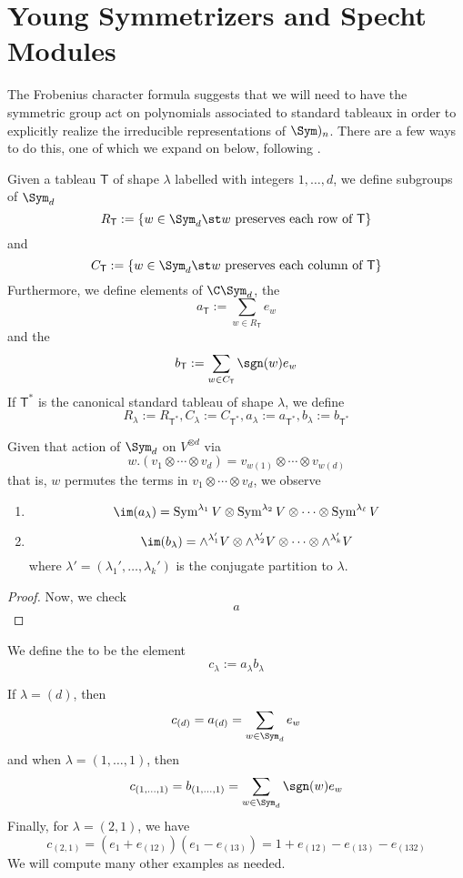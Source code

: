 \documentclass[11pt,leqno,oneside]{amsart}
\numberwithin{thm}{section}
\newcommand{\T}{\mathsf{T}}
\newcommand{\SymP}{\operatorname{Sym}}
\newcommand{\ExtP}{\wedge}
\begin{document}
\section{Young Symmetrizers and Specht Modules}
The Frobenius character formula suggests that we will need to have the
symmetric group act on polynomials associated to standard
tableaux in order to explicitly realize the irreducible
representations of \(\Sym)_n\). There are a few ways to do this, one
of which we expand on below, following \cite{fulton-harris}.
\begin{defn}
  Given a tableau \(\T\) of shape \(\lambda\) labelled with integers
  \(1, \ldots, d\), we define subgroups of \(\Sym_d\) \[
    R_\T := \{w \in \Sym_d \st w \text{ preserves each row of
    }\T\}
  \]
  and \[
    C_\T := \{w \in \Sym_d \st w \text{ preserves each column of
    }\T\}
  \]
  Furthermore, we define elements of \(\C\Sym_d\), the  \[
    a_\T := \sum_{w \in R_\T} e_w
  \]
  and the  \[
    b_\T := \sum_{w \in C_\T} \sgn(w) e_w
  \]
  If \(\T^*\) is the canonical standard tableau of shape \(\lambda\), we
  define \[
    R_\lambda := R_{\T^*}, C_\lambda := C_{\T^*}, a_\lambda :=
    a_{\T^*}, b_{\lambda} := b_{\T^*}
  \]
\end{defn}
\begin{prop}
  Given that action of \(\Sym_d\) on \(V^{\otimes d}\) via \[
    w.(v_1 \otimes \cdots \otimes v_d) = v_{w(1)} \otimes \cdots
    \otimes v_{w(d)}
  \]
  that is, \(w\) permutes the terms in \(v_1 \otimes \cdots \otimes
  v_d\), we observe
  \begin{enumerate}
  \item \[
      \im(a_\lambda) = \SymP^{\lambda_1} V \otimes \SymP^{\lambda_2} V
      \otimes \cdots \otimes \SymP^{\lambda_\ell} V
    \]
  \item \[
      \im(b_\lambda) = \ExtP^{\lambda_1'} V \otimes \ExtP^{\lambda'_2} V
      \otimes \cdots \otimes \ExtP^{\lambda'_k} V
    \]
    where \(\lambda' = (\lambda_1', \ldots, \lambda_k')\) is the
    conjugate partition to \(\lambda\).
  \end{enumerate}
\end{prop}
\begin{proof}
  Now, we check \[
    a
  \]
\end{proof}
\begin{defn}
  We define the  to be the element \[
    c_\lambda := a_\lambda b_\lambda
  \]
\end{defn}
\begin{example}
  If \(\lambda = (d)\), then \[
    c_{(d)} = a_{(d)} = \sum_{w \in \Sym_d} e_w
  \]
  and when \(\lambda = (1,\ldots,1)\), then \[
    c_{(1,\ldots,1)} = b_{(1, \ldots, 1)} = \sum_{w \in \Sym_d}
    \sgn(w)e_w
  \]
  Finally, for \(\lambda = (2,1)\), we have \[
    c_{(2,1)} = (e_1+e_{(12)})(e_1-e_{(13)}) = 1 +
    e_{(12)}-e_{(13)}-e_{(132)} 
  \]
  We will compute many other examples as needed.
\end{example}
\end{document}
